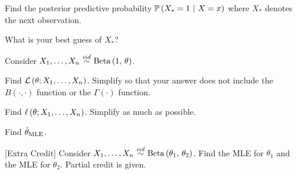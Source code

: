 \documentclass[12pt]{article}
\begin{document}
 Find the posterior predictive probability $\mathbb{P}\left(X_* = 1~|~X = x\right)$ where $X_*$ denotes the next observation. 

 What is your best guess of $X_*$? 
\eenum

\problem Consider $\Xoneton \iid \betanot{1}{\theta}$.

\benum

 Find $\mathcal{L}\left(\theta ; X_1, \ldots, X_n\right)$. Simplify so that your answer does not include the $B(\cdot,\cdot)$ function or the $\Gamma(\cdot)$ function.

 Find $\ell\left(\theta ; X_1, \ldots, X_n\right)$. Simplify as much as possible.

 Find $\hat{\theta}_{\mathrm{MLE}}$. 

 [Extra Credit] Consider $\Xoneton \iid \betanot{\theta_1}{\theta_2}$. Find the MLE for $\theta_1$ and the MLE for $\theta_2$. Partial credit is given.
\eenum
\end{document}
